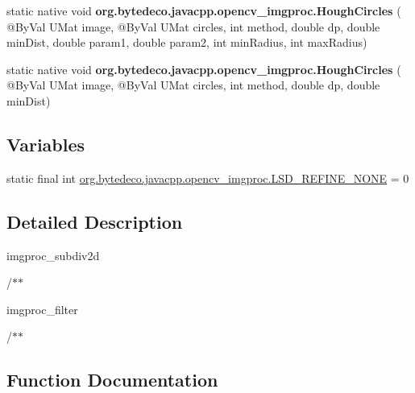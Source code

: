 \begin{DoxyCompactItemize}
\item 
\mbox{\label{group__imgproc__feature_ga85e35e4b6c0b17ee201ef0f6b8256062}} 
static native void {\bfseries org.\+bytedeco.\+javacpp.\+opencv\+\_\+imgproc.\+Hough\+Circles} ( @By\+Val U\+Mat image, @By\+Val U\+Mat circles, int method, double dp, double min\+Dist, double param1, double param2, int min\+Radius, int max\+Radius)
\item 
\mbox{\label{group__imgproc__feature_ga56ed820c9d4ac68762d0826e1212b3f6}} 
static native void {\bfseries org.\+bytedeco.\+javacpp.\+opencv\+\_\+imgproc.\+Hough\+Circles} ( @By\+Val U\+Mat image, @By\+Val U\+Mat circles, int method, double dp, double min\+Dist)
\end{DoxyCompactItemize}
\subsection*{Variables}
\begin{DoxyCompactItemize}
\item 
static final int \hyperlink{group__imgproc__feature_ga878ecf12ede1cbc57e30e4e700c8385d}{org.\+bytedeco.\+javacpp.\+opencv\+\_\+imgproc.\+L\+S\+D\+\_\+\+R\+E\+F\+I\+N\+E\+\_\+\+N\+O\+NE} = 0
\end{DoxyCompactItemize}


\subsection{Detailed Description}
imgproc\+\_\+subdiv2d 

/$\ast$$\ast$

imgproc\+\_\+filter 

/$\ast$$\ast$ 

\subsection{Function Documentation}
\mbox{\label{group__imgproc__feature_gae85c4c5d2fd8006e4194e3ee73d2277d}} 
